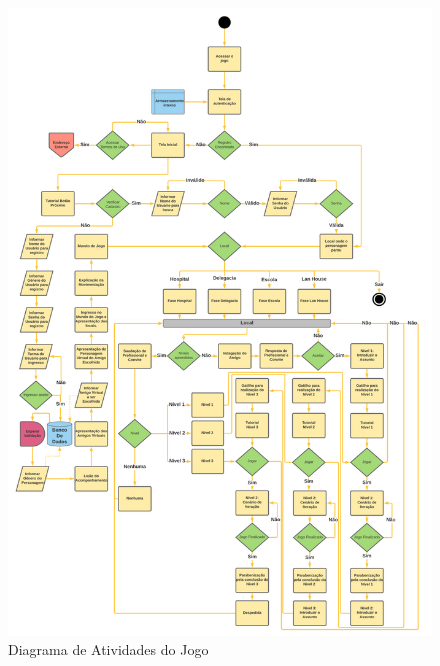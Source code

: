 \begin{figure}[htb]
\caption{\label{fig:Diagrama}Diagrama de Atividades do Jogo}
\begin{center}
  \includegraphics[width=\linewidth]{./Figuras/DiagramaJoginho.png}
  \end{center}

\end{figure}






